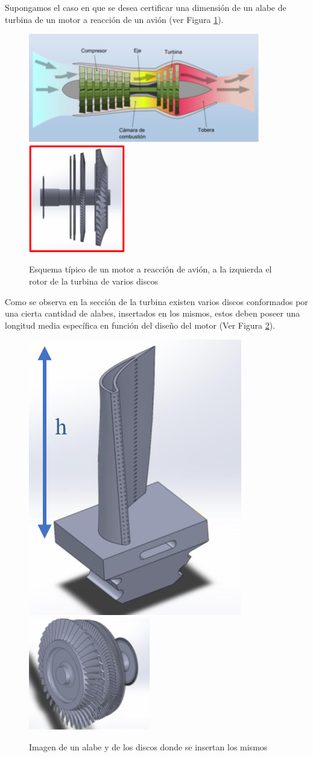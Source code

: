 \documentclass[oneside,spanish]{amsart}
\numberwithin{equation}{section}
\theoremstyle{definition}
\begin{document}
Supongamos el caso en que se desea certificar una dimensión de un alabe de turbina de un motor a reacción de un avión (ver Figura \ref{fig:1}).

\begin{figure}[h]
	\centering
	\includegraphics[height=0.3\linewidth]{Anexos-06/Imagen1}
	\includegraphics[height=0.3\linewidth]{Anexos-06/Imagen2}
	\caption{Esquema típico de un motor a reacción de avión, a la izquierda el rotor de la turbina de varios discos}
	\label{fig:1}
\end{figure}

Como se observa en la sección de la turbina existen varios discos conformados por una cierta cantidad de alabes, insertados en los mismos, estos deben poseer una longitud media específica en función del diseño del motor (Ver Figura \ref{fig:2}).

\begin{figure}[h]
	\centering
	\includegraphics[height=0.3\linewidth]{Anexos-06/Imagen3}
	\includegraphics[height=0.3\linewidth]{Anexos-06/Imagen4}
	\caption{Imagen de un alabe y de los discos donde se insertan los mismos}
	\label{fig:2}
\end{figure}
\end{document}
